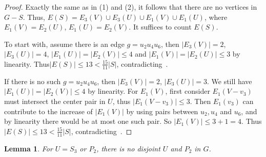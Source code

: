 \documentclass[a4paper]{article}
\newtheorem{lem}[thm]{Lemma}
\begin{document}
\begin{proof}
Exactly the same as in (1) and (2), it follows that there are no vertices in $G-S$. Thus, $E(S) = E_3(V)\cup E_3(U)\cup E_1(V) \cup E_1(U)$, where $E_1(V)=E_2(U)$, $E_1(U)=E_2(V)$. It suffices to count $E(S)$. 

To start with, assume there is an edge $g = u_2u_4u_6$, then $|E_3(V)|=2$, $|E_3(U)|= 4$, $|E_1(U)|=|E_2(V)|\le 4$ and $|E_1(V)|=|E_2(U)|\le 3$ by linearity. Thus$|E(S)|\leq 13<\frac{15}{11}|S|$, contradicting~. 

If there is no such $g = u_2u_4u_6$, then $|E_3(V)|=2$, $|E_3(U)|= 3$. We still have $|E_1(U)|=|E_2(V)|\le 4$ by linearity. For $E_1(V)$, first consider $E_1(V-v_3)$ must intersect the center pair in $U$, thus $|E_1(V-v_3)|\le 3$. Then $E_1(v_3)$ can contribute to the increase of $|E_1(V)|$ by using pairs between $u_2,u_4$ and $u_6$, and by linearity there would be at most one such pair. So $|E_1(V)|\le 3+1=4$. Thus $|E(S)|\leq 13<\frac{15}{11}|S|$, contradicting~. 
\end{proof}

\begin{lem}\label{2P2}
    For $U = S_3$ or $P_2$, there is no disjoint $U$ and $P_2$ in $G$.
\end{lem}
\end{document}
